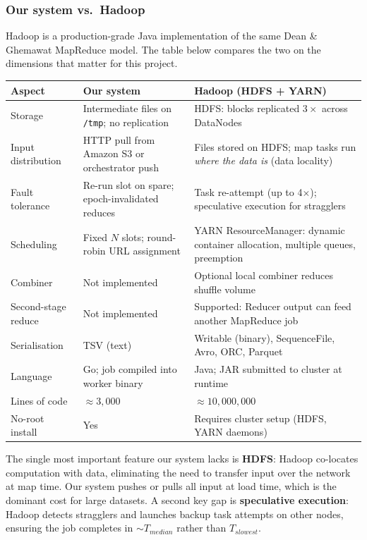 \documentclass[11pt,a4paper]{article}
\begin{document}
\subsubsection{Our system vs.\ Hadoop}

Hadoop is a production-grade Java implementation of the same Dean \& Ghemawat
MapReduce model. The table below compares the two on the dimensions that matter
for this project.

\begin{center}\small
\begin{tabularx}{\linewidth}{>{\raggedright\arraybackslash}p{3.2cm} X X}
\toprule
\textbf{Aspect} & \textbf{Our system} & \textbf{Hadoop (HDFS + YARN)} \\
\midrule
Storage & Intermediate files on \texttt{/tmp}; no replication & HDFS: blocks replicated $3\times$ across DataNodes \\
Input distribution & HTTP pull from Amazon S3 or orchestrator push & Files stored on HDFS; map tasks run \emph{where the data is} (data locality) \\
Fault tolerance & Re-run slot on spare; epoch-invalidated reduces & Task re-attempt (up to 4$\times$); speculative execution for stragglers \\
Scheduling & Fixed $N$ slots; round-robin URL assignment & YARN ResourceManager: dynamic container allocation, multiple queues, preemption \\
Combiner & Not implemented & Optional local combiner reduces shuffle volume \\
Second-stage reduce & Not implemented & Supported: Reducer output can feed another MapReduce job \\
Serialisation & TSV (text) & Writable (binary), SequenceFile, Avro, ORC, Parquet \\
Language & Go; job compiled into worker binary & Java; JAR submitted to cluster at runtime \\
Lines of code & $\approx 3{,}000$ & $\approx 10{,}000{,}000$ \\
No-root install & Yes & Requires cluster setup (HDFS, YARN daemons) \\
\bottomrule
\end{tabularx}
\end{center}

The single most important feature our system lacks is \textbf{HDFS}: Hadoop
co-locates computation with data, eliminating the need to transfer input over
the network at map time. Our system pushes or pulls all input at load time,
which is the dominant cost for large datasets. A second key gap is
\textbf{speculative execution}: Hadoop detects stragglers and launches backup
task attempts on other nodes, ensuring the job completes in $\sim T_{median}$
rather than $T_{slowest}$.
\end{document}
